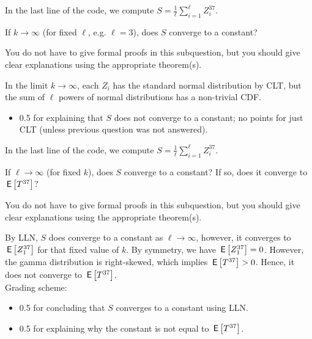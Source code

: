 \vspace*{20pt}



\begin{exercise}[0.5]
In the last line of the code, we compute $S = \frac1{\ell}\sum_{i=1}^{\ell} Z_i^{37}$.

 If $k \to \infty$ (for fixed $\ell$, e.g. $\ell=3$), does $S$ converge to a constant? 

You do not have to give formal proofs in this subquestion, but you should give clear explanations using the appropriate theorem(s). 
\begin{solution}
In the limit $k \to \infty$, each $Z_i$ has the standard normal distribution by CLT, but the sum of $\ell$ powers of normal distributions has a non-trivial CDF. \\
\begin{itemize}
\item 0.5 for explaining that $S$ does not converge to a constant; no points for just CLT (unless previous question was not answered).
\end{itemize}
\end{solution}
\end{exercise}



\vspace*{20pt}



\begin{exercise}[1]
In the last line of the code, we compute $S = \frac1{\ell}\sum_{i=1}^{\ell} Z_i^{37}$.

If $\ell \to \infty$ (for fixed $k$), does $S$ converge to a constant? 
If so, does it converge to $\,\mathsf{E}\left[T^{37}\right]$?

You do not have to give formal proofs in this subquestion, but you should give clear explanations using the appropriate theorem(s). 
\begin{solution}
By LLN, $S$ does converge to a constant as  $\ell \to \infty$, however, it converges to $\,\mathsf{E}\left[Z_1^{37}\right]$ for that fixed value of $k$. By symmetry, we have  $\,\mathsf{E}\left[Z_1^{37}\right] = 0$. However, the gamma distribution is right-skewed, which implies $\,\mathsf{E}\left[T^{37}\right] > 0$. Hence, it does not converge to $\,\mathsf{E}\left[T^{37}\right]$. \\
Grading scheme:
\begin{itemize}
\item 0.5 for concluding that $S$ converges to a constant using LLN.
\item 0.5 for explaining why the constant is not equal to $\,\mathsf{E}\left[T^{37}\right]$.
\end{itemize}
\end{solution}
\end{exercise}


